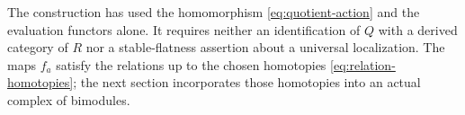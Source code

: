 The construction has used the homomorphism
\eqref{eq:quotient-action} and the evaluation functors alone.
It requires neither an identification of $Q$ with a derived category
of $R$ nor a stable-flatness assertion about a universal localization.
The maps $f_a$ satisfy the relations up to the chosen homotopies
\eqref{eq:relation-homotopies}; the next section incorporates those
homotopies into an actual complex of bimodules.
